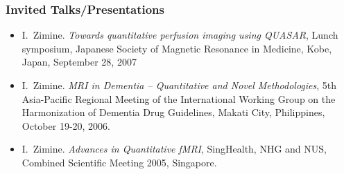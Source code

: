 \documentclass[a4paper,11pt,oneside]{article}
\begin{document}
\subsubsection*{Invited Talks/Presentations}
\begin{itemize}

\item I.~Zimine. \textit{Towards quantitative perfusion imaging using
QUASAR}, Lunch symposium, Japanese Society of Magnetic Resonance in
Medicine, Kobe, Japan, September 28, 2007

\item I.~Zimine. \textit{MRI in Dementia -- Quantitative and Novel
Methodologies}, 5th Asia-Pacific Regional Meeting of the International
Working Group on the Harmonization of Dementia Drug Guidelines, Makati
City, Philippines, October 19-20, 2006.


\item I.~Zimine. \textit{Advances in Quantitative fMRI}, 
SingHealth, NHG and NUS, Combined Scientific Meeting 2005, Singapore.

\end{itemize}




\end{document}
